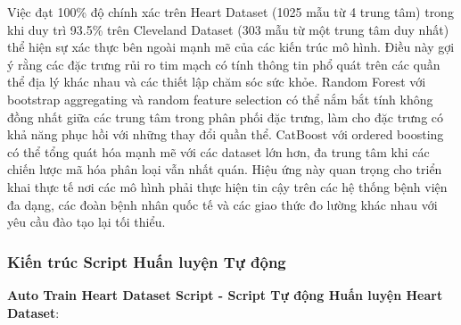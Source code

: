 Việc đạt 100\% độ chính xác trên Heart Dataset (1025 mẫu từ 4 trung tâm) trong khi duy trì 93.5\% trên Cleveland Dataset (303 mẫu từ một trung tâm duy nhất) thể hiện sự xác thực bên ngoài mạnh mẽ của các kiến trúc mô hình. Điều này gợi ý rằng các đặc trưng rủi ro tim mạch có tính thông tin phổ quát trên các quần thể địa lý khác nhau và các thiết lập chăm sóc sức khỏe. Random Forest với bootstrap aggregating và random feature selection có thể nắm bắt tính không đồng nhất giữa các trung tâm trong phân phối đặc trưng, làm cho đặc trưng có khả năng phục hồi với những thay đổi quần thể. CatBoost với ordered boosting có thể tổng quát hóa mạnh mẽ với các dataset lớn hơn, đa trung tâm khi các chiến lược mã hóa phân loại vẫn nhất quán. Hiệu ứng này quan trọng cho triển khai thực tế nơi các mô hình phải thực hiện tin cậy trên các hệ thống bệnh viện đa dạng, các đoàn bệnh nhân quốc tế và các giao thức đo lường khác nhau với yêu cầu đào tạo lại tối thiểu.

\subsubsection{Kiến trúc Script Huấn luyện Tự động}

\textbf{Auto Train Heart Dataset Script - Script Tự động Huấn luyện Heart Dataset}:

